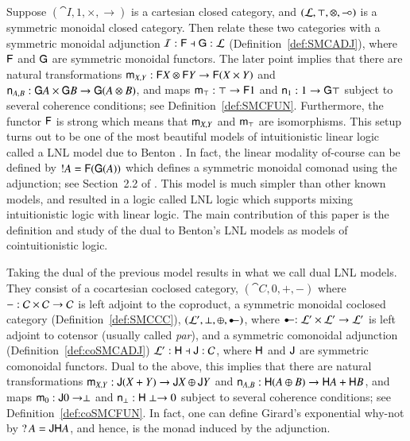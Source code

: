 Suppose $(\cat{I}, 1, \times, \to)$ is a cartesian closed category,
and $(\mathcal{L}, \top, \otimes, \mathrel{-\!\circ})$ is a symmetric monoidal closed
category.  Then relate these two categories with a symmetric monoidal
adjunction $\mathcal{I} : \mathsf{F} \dashv \mathsf{G} : \mathcal{L}$
(Definition~\ref{def:SMCADJ}), where $\mathsf{F}$ and $\mathsf{G}$ are
symmetric monoidal functors.  The later point implies that there are
natural transformations $\mathsf{m}_{X,Y} : \mathsf{F}X \otimes \mathsf{F}Y \rightarrow
\mathsf{F}(X \times Y)$ and $\mathsf{n}_{A,B} : \mathsf{G}A \times \mathsf{G}B \rightarrow
\mathsf{G}(A \otimes B)$, and maps $\mathsf{m}_{\top} : \top \rightarrow \mathsf{F}1$ and
$\mathsf{n}_{1} : 1 \rightarrow \mathsf{G}\top$ subject to several coherence conditions;
see Definition~\ref{def:SMCFUN}.  Furthermore, the functor $\mathsf{F}$
is strong which means that $\mathsf{m}_{X,Y}$ and $\mathsf{m}_{\top}$ are isomorphisms.
This setup turns out to be one of the most beautiful models of
intuitionistic linear logic called a LNL model due to Benton
\cite{Benton:1994}.  In fact, the linear modality of-course can be
defined by $!A = \mathsf{F}(\mathsf{G}(A))$ which defines a symmetric
monoidal comonad using the adjunction; see Section~2.2 of
\cite{Benton:1994}.  This model is much simpler than other known
models, and resulted in a logic called LNL logic which supports mixing
intuitionistic logic with linear logic.  The main contribution of this
paper is the definition and study of the dual to Benton's LNL models
as models of cointuitionistic logic.

Taking the dual of the previous model results in what we call dual LNL
models. They consist of a cocartesian coclosed category, $(\cat{C}, 0,
+, -)$ where $- : \mathcal{C} \times \mathcal{C} \rightarrow \mathcal{C}$ is left adjoint
to the coproduct, a symmetric monoidal coclosed category
(Definition~\ref{def:SMCCC}), $(\cat{L}', \perp, \oplus, \colimp)$,
where $\colimp : \cat{L}' \times \cat{L}' \mto \cat{L}'$ is left
adjoint to cotensor (usually called \emph{par}), and a symmetric
comonoidal adjunction (Definition~\ref{def:coSMCADJ}) $\mathcal{L'} :
\mathsf{H} \dashv \mathsf{J} : \mathcal{C}$, where $\mathsf{H}$ and $\mathsf{J}$
are symmetric comonoidal functors. Dual to the above, this implies
that there are natural transformations $\mathsf{m}_{X,Y} : \mathsf{J}(X + Y) \rightarrow
\mathsf{J}X \oplus \mathsf{J}Y$ and $\mathsf{n}_{A,B} : \mathsf{H}(A \oplus B) \rightarrow
\mathsf{H}A + \mathsf{H}B$, and maps $\mathsf{m}_{0} : \mathsf{J}0 \rightarrow \perp$ and
$\mathsf{n}_{\perp} : \mathsf{H}\perp \rightarrow 0$ subject to several coherence conditions;
see Definition~\ref{def:coSMCFUN}.  In fact, one can define Girard's
exponential why-not by $\mathop{?} A = \mathsf{JH}A$, and hence, is the monad
induced by the adjunction.

